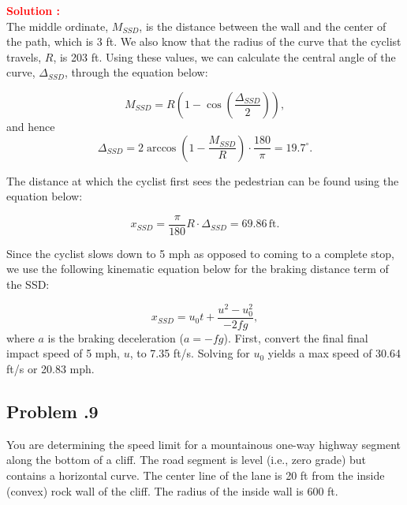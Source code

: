 \documentclass[12pt]{article}
\newcommand{\customsubsection}[1]{
  \subsection*{Problem \thesection.#1}
}
\begin{document}
\textbf{\textcolor{red}{Solution :}} \\
The middle ordinate, \(M_{SSD}\), is the distance between the wall and the center of the path, which is 3 ft. We also know that the radius of the curve that the cyclist travels, $R$, is 203 ft. Using these values, we can calculate the central angle of the curve, $\Delta_{SSD}$, through the equation below:

\[
M_{SSD} = R \left(1 - \cos\left(\frac{\Delta_{SSD}}{2}\right)\right),
\]
and hence
\[
\Delta_{SSD} = 2 \arccos \left(1 - \frac{M_{SSD}}{R}\right) \cdot \frac{180}{\pi} = 19.7^{\circ}.
\]

The distance at which the cyclist first sees the pedestrian can be found using the equation below:

\[
x_{SSD} = \frac{\pi}{180} R \cdot \Delta_{SSD} = 69.86 \, \text{ft}.
\]

Since the cyclist slows down to 5 mph as opposed to coming to a complete stop, we use the following kinematic equation below for the braking distance term of the SSD:

\[
x_{SSD} = u_0 t + \frac{u^2 - u_0^2}{-2fg},
\]
where \(a\) is the braking deceleration (\(a = -fg\)). First, convert the final final impact speed of 5 mph, $u$, to 7.35 ft/s.
Solving for \(u_0\) yields a max speed of 30.64 ft/s or 20.83 mph.

\newpage


\customsubsection{9}
You are determining the speed limit for a mountainous one-way highway segment along the bottom of a cliff. The road segment is level (i.e., zero grade) but contains a horizontal curve. The center line of the lane is 20 ft from the inside (convex) rock wall of the cliff. The radius of the inside wall is 600 ft.
\end{document}
